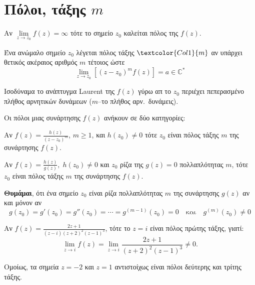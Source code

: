 \section*{Πόλοι, τάξης \ensuremath{ m }}

\begin{dfn} 
  Αν $\lim\limits_{z\to z_0}f(z)=\infty$ τότε το σημείο $z_0$ καλείται 
  \textcolor{Col1}{πόλος} της $f(z)$. 
\end{dfn}

\begin{dfn}
  Ένα ανώμαλο σημείο $z_0$ λέγεται \textcolor{Col1}{πόλος τάξης} 
  $\textcolor{Col1}{m}$ αν υπάρχει θετικός ακέραιος αριθμός $m$ τέτοιος ώστε 
  \[
    \lim\limits_{z\to z_0}\left[(z-z_0)^mf(z)\right]=a \in \mathbb{C}^{*}
  \]
  \begin{myitemize}
    \item Ισοδύναμα το ανάπτυγμα Laurent της $f(z)$ \textcolor{Col2}{γύρω απ το $z_0$} 
      περιέχει πεπερασμένο πλήθος αρνητικών δυνάμεων ($m$--το πλήθος αρν.\ δυνάμεις). 
  \end{myitemize}
\end{dfn}

\begin{rem}
  Οι πόλοι μιας συνάρτησης $ f(z) $ ανήκουν σε δύο κατηγορίες:
  \begin{myitemize}
    \item Αν $ f(z) = \frac{h(z)}{(z-z_{0})^{m}}$, $m \geq 1 $, και $ h(z_{0}) \neq 0 $ 
      τότε $ z_{0} $ είναι πόλος τάξης $ m $ της συνάρτησης $f(z)$.
    \item Αν $ f(z) = \frac{h(z)}{g(z)}, \; h(z_{0}) \neq 0 $ και $ z_{0} $ ρίζα της 
      $ g(z) = 0 $ πολλαπλότητας $ m $, τότε $ z_{0} $ είναι πόλος τάξης $ m
      $ της συνάρτησης $f(z)$.
  \end{myitemize}
\end{rem}

\begin{rem}
  \textbf{Θυμάμαι}, ότι ένα σημείο $ z_{0} $ είναι ρίζα \textcolor{Col1}{πολλαπλότητας 
  $ m $} της συνάρτησης $ g(z) $ αν και μόνον αν 
  \[
    g(z_{0}) = g'(z_{0}) = g''(z_{0}) = \cdots = g^{(m-1)}(z_{0}) = 0 \quad \text{και} 
    \quad g^{(m)}(z_{0}) \neq 0 
  \] 
\end{rem}

\begin{example}
  Αν $f(z)=\frac{2z+1}{(z-i)(z+2)^2(z-1)^3}$, τότε το $z=i$ είναι πόλος πρώτης τάξης, 
  γιατί: 
  \[
    \lim\limits_{z\to i}f(z)=\lim\limits_{z\to i}\frac{2z+1}{(z+2)^2(z-1)^3}\neq 0.
  \]

  Ομοίως, τα σημεία $z=-2$ και $z=1$ αντιστοίχως είναι πόλοι δεύτερης και τρίτης τάξης.
\end{example}

